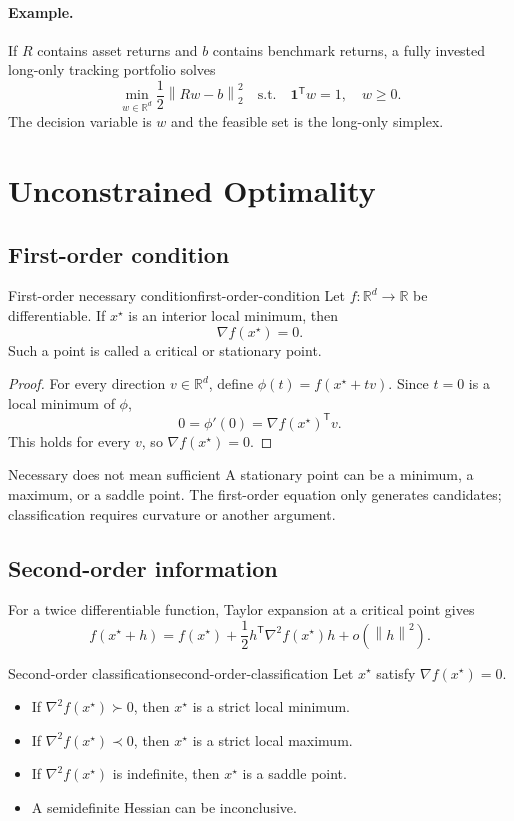 \documentclass[11pt]{article}
\newcommand{\R}{\mathbb{R}}
\newcommand{\trans}{^{\mathsf T}}
\newcommand{\grad}{\nabla}
\newcommand{\norm}[1]{\left\lVert#1\right\rVert}
\theoremstyle{definition}
\theoremstyle{remark}
\begin{document}
\paragraph{Example.}
If $R$ contains asset returns and $b$ contains benchmark returns, a fully
invested long-only tracking portfolio solves
\[
  \boxed{
  \min_{w\in\R^d}\frac12\norm{Rw-b}_2^2
  \quad\text{s.t.}\quad \mathbf1\trans w=1,\quad w\geq0.}
\]
The decision variable is $w$ and the feasible set is the long-only simplex.

\section{Unconstrained Optimality}

\subsection{First-order condition}

\begin{keyproposition}{First-order necessary condition}{first-order-condition}
Let $f:\R^d\to\R$ be differentiable. If $x^\star$ is an interior local
minimum, then
\[
  \boxed{\grad f(x^\star)=0.}
\]
Such a point is called a critical or stationary point.
\end{keyproposition}

\begin{proof}
For every direction $v\in\R^d$, define
$\phi(t)=f(x^\star+tv)$. Since $t=0$ is a local minimum of $\phi$,
\[
  0=\phi'(0)=\grad f(x^\star)\trans v.
\]
This holds for every $v$, so $\grad f(x^\star)=0$.
\end{proof}

\begin{warningbox}{Necessary does not mean sufficient}
A stationary point can be a minimum, a maximum, or a saddle point. The
first-order equation only generates candidates; classification requires
curvature or another argument.
\end{warningbox}

\subsection{Second-order information}

For a twice differentiable function, Taylor expansion at a critical point gives
\[
  f(x^\star+h)
  =f(x^\star)+\frac12h\trans\grad^2f(x^\star)h+o(\norm{h}^2).
\]

\begin{keyproposition}{Second-order classification}{second-order-classification}
Let $x^\star$ satisfy $\grad f(x^\star)=0$.
\begin{itemize}
  \item If $\grad^2f(x^\star)\succ0$, then $x^\star$ is a strict local minimum.
  \item If $\grad^2f(x^\star)\prec0$, then $x^\star$ is a strict local maximum.
  \item If $\grad^2f(x^\star)$ is indefinite, then $x^\star$ is a saddle point.
  \item A semidefinite Hessian can be inconclusive.
\end{itemize}
\end{keyproposition}
\end{document}

